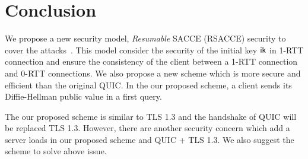 \section{Conclusion} \label{sec:conclusion}

We propose a new security model, \textit{Resumable} SACCE (RSACCE) security
to cover the attacks~\cite{LJBN15:QUIC}.
This model consider the security of the initial key $\mathsf{ik}$ in 1-RTT connection
and ensure the consistency of the client between a 1-RTT connection and 0-RTT
connections.
We also propose a new scheme which is more secure and efficient than the original QUIC.
In the our proposed scheme, a client sends its Diffie-Hellman public value in a
first query.

The our proposed scheme is similar to TLS 1.3 and the handshake of QUIC will be replaced
TLS 1.3. However, there are another security concern which add a server loads in our
proposed scheme and QUIC + TLS 1.3.
We also suggest the scheme to solve above issue.